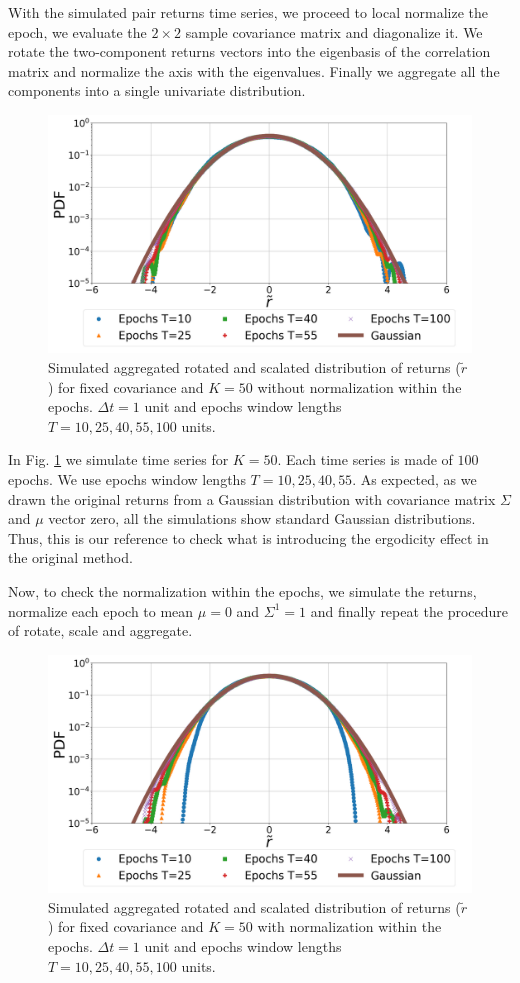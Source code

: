 With the simulated pair returns time series, we proceed to local normalize the
epoch, we evaluate the $2 \times 2$ sample covariance matrix and diagonalize
it. We rotate the two-component returns vectors into the eigenbasis of the
correlation matrix and normalize the axis with the eigenvalues. Finally we
aggregate all the components into a single univariate distribution.

\begin{figure}[htbp]
    \centering
    \includegraphics[width=0.6\columnwidth]
    {figures/06_epochs_sim_agg_ret_pairs_no_norm.png}
    \caption{Simulated aggregated rotated and scalated distribution of returns
             ($\tilde{r}$) for fixed covariance and $K=50$ without
             normalization within the epochs. $\Delta t = 1$ unit and epochs
             window  lengths $T=10, 25, 40, 55, 100$ units.}
    \label{fig:epochs_agg_ret_pairs_no_norm}
\end{figure}

In Fig. \ref{fig:epochs_agg_ret_pairs_no_norm} we simulate time series for
$K = 50$. Each time series is made of $100$ epochs. We use epochs window
lengths $T = 10, 25, 40, 55$. As expected, as we drawn the original returns
from a Gaussian distribution with covariance matrix $\Sigma$ and $\mu$ vector
zero, all the simulations show standard Gaussian distributions. Thus, this is
our reference to check what is introducing the ergodicity effect in the 
original method.

Now, to check the normalization within the epochs, we simulate the returns,
normalize each epoch to mean $\mu = 0$ and $\Sigma^{1} = 1$ and finally repeat
the procedure of rotate, scale and aggregate.

\begin{figure}[htbp]
    \centering
    \includegraphics[width=0.6\columnwidth]
    {figures/06_epochs_sim_agg_ret_pairs_norm.png}
    \caption{Simulated aggregated rotated and scalated distribution of returns
             ($\tilde{r}$) for fixed covariance and $K=50$ with normalization
             within the epochs. $\Delta t = 1$ unit and epochs window  lengths
             $T=10, 25, 40, 55, 100$ units.}
    \label{fig:epochs_agg_ret_pairs_norm}
\end{figure}


